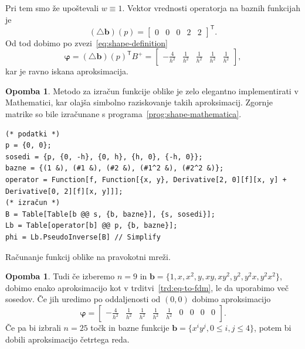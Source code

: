 \documentclass[12pt,a4paper]{article}
\theoremstyle{definition} %
\newtheorem{opomba}[definicija]{Opomba}
\theoremstyle{plain} %
\numberwithin{equation}{section}
\newcommand{\T}{\mathsf{T}}
\renewcommand{\b}{\boldsymbol}
\renewcommand{\phi}{\varphi}
\begin{document}
Pri tem smo že upoštevali $w \equiv 1$.
Vektor vrednosti operatorja na baznih funkcijah je
\[
  (\triangle \b{b})(p) =
\begin{bmatrix}
  0 & 0 & 0 & 2 & 2
\end{bmatrix}^\T.
\]
Od tod dobimo po zvezi~\eqref{eq:shape-definition}
\[
  \b\phi = (\triangle \b b)(p)^\T B^{+} =
  \begin{bmatrix}
    -\frac{4}{h^2} & \frac{1}{h^2} & \frac{1}{h^2} & \frac{1}{h^2} &
    \frac{1}{h^2}
  \end{bmatrix},
\]
kar je ravno iskana aproksimacija.
\endproof
\begin{opomba}
  Metodo za izračun funkcije oblike je zelo elegantno implementirati v
  Mathematici, kar olajša simbolno raziskovanje takih aproksimacij. Zgornje matrike so
  bile izračunane s programa~\ref{prog:shape-mathematica}.

  \begin{listing}[!h]
    \vspace{-1ex}
  \begin{verbatim}
(* podatki *)
p = {0, 0};
sosedi = {p, {0, -h}, {0, h}, {h, 0}, {-h, 0}};
bazne = {(1 &), (#1 &), (#2 &), (#1^2 &), (#2^2 &)};
operator = Function[f, Function[{x, y}, Derivative[2, 0][f][x, y] + Derivative[0, 2][f][x, y]]];
(* izračun *)
B = Table[Table[b @@ s, {b, bazne}], {s, sosedi}];
Lb = Table[operator[b] @@ p, {b, bazne}];
phi = Lb.PseudoInverse[B] // Simplify
  \end{verbatim}
  \vspace{-3ex}
  \caption{Računanje funkcij oblike na pravokotni mreži.}
  \label{prog:shape-mathematica}
  \end{listing}
\end{opomba}
\begin{opomba}
  \label{op:fdm-9}
  Tudi če izberemo $n=9$ in $\b b = \{1, x, x^2, y, xy, xy^2, y^2, y^2 x, y^2
  x^2 \}$, dobimo enako aproksimacijo kot v trditvi~\ref{trd:eq-to-fdm}, le da
  uporabimo več sosedov. Če jih uredimo po oddaljenosti od $(0, 0)$ dobimo
  aproksimacijo
  \[
    \b\phi =  \begin{bmatrix}
    -\frac{4}{h^2} & \frac{1}{h^2} & \frac{1}{h^2} & \frac{1}{h^2} &
    \frac{1}{h^2} & 0 & 0 & 0 & 0
  \end{bmatrix}.
\]
 Če pa bi izbrali $n=25$ točk in bazne funkcije $\b b = \{x^iy^j, 0 \leq i, j
 \leq 4 \}$, potem bi dobili aproksimacijo četrtega reda.
\end{opomba}
\end{document}
